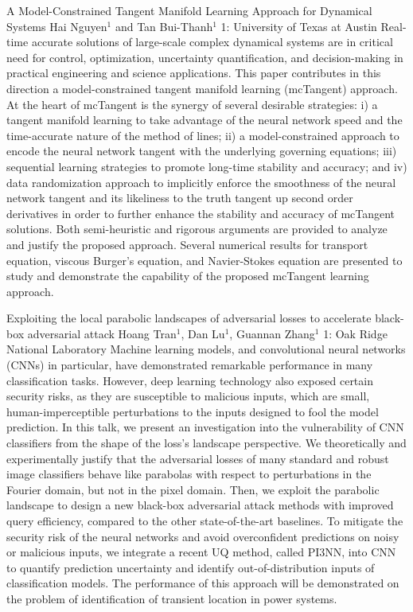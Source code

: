 \vspace{1.5ex}
\abs
{A Model-Constrained Tangent Manifold Learning Approach for Dynamical Systems}
{Hai Nguyen$^1$ and Tan Bui-Thanh$^1$}
{1: University of Texas at Austin}
{Real-time accurate solutions of large-scale complex dynamical systems are in critical need for control, optimization, uncertainty quantification, and decision-making in practical engineering and science applications. This paper contributes in this direction a model-constrained tangent manifold learning (mcTangent) approach. At the heart of mcTangent is the synergy of several desirable strategies: i) a tangent manifold learning to take advantage of the neural network speed and the time-accurate nature of the method of lines; ii) a model-constrained approach to encode the neural network tangent with the underlying governing equations; iii) sequential learning strategies to promote long-time stability and accuracy; and iv) data randomization approach to implicitly enforce the smoothness of the neural network tangent and its likeliness to the truth tangent up second order derivatives in order to further enhance the stability and accuracy of mcTangent solutions. Both semi-heuristic and rigorous arguments are provided to analyze and justify the proposed approach. Several numerical results for transport equation, viscous Burger's equation, and Navier-Stokes equation are presented to study and demonstrate the capability of the proposed mcTangent learning approach.}


\vspace{1.5ex}
\abs
{Exploiting the local parabolic landscapes of adversarial losses to accelerate black-box adversarial attack}
{Hoang Tran$^{1}$, Dan Lu$^{1}$, Guannan Zhang$^{1}$}
{1: Oak Ridge National Laboratory}
{Machine learning models, and convolutional neural networks (CNNs) in particular, have demonstrated remarkable performance in many classification tasks. However, deep learning technology also exposed certain security risks, as they are susceptible to malicious inputs, which are small, human-imperceptible perturbations to the inputs designed to fool the model prediction. In this talk, we present an investigation into the vulnerability of CNN classifiers from the shape of the loss’s landscape perspective. We theoretically and experimentally justify that the adversarial losses of many standard and robust image classifiers behave like parabolas with respect to perturbations in the Fourier domain, but not in the pixel domain. Then, we exploit the parabolic landscape to design a new black-box adversarial attack methods with improved query efficiency, compared to the other state-of-the-art baselines. To mitigate the security risk of the neural networks and avoid overconfident predictions on noisy or malicious inputs, we integrate a recent UQ method, called PI3NN, into CNN to quantify prediction uncertainty and identify out-of-distribution inputs of classification models. The performance of this approach will be demonstrated on the problem of identification of transient location in power systems.}


